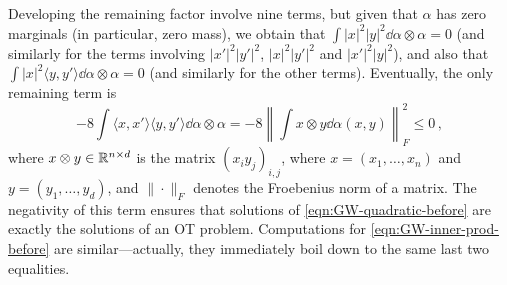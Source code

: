         Developing the remaining factor involve nine terms, but given that $\alpha$ has zero marginals (in particular, zero mass), we obtain that $\int |x|^2 |y|^2 \dd \alpha\! \otimes \!\alpha = 0$ (and similarly for the terms involving $|x'|^2 |y'|^2$, $|x|^2|y'|^2$ and $|x'|^2|y|^2$), and also that $\int |x|^2 \langle y,y' \rangle \dd \alpha\! \otimes\! \alpha = 0$ (and similarly for the other terms).
        Eventually, the only remaining term is
        \begin{equation}
            - 8 \int \langle x, x' \rangle \langle y,y' \rangle \dd \alpha \!\otimes\! \alpha \nonumber
            =  - 8 \left\| \int x \otimes y \dd \alpha(x,y) \right\|_F^2 \leq 0\,, \label{EqCorrelation1}
        \end{equation}
        where $x \otimes y \in \mathbb{R}^{n \times d}$ is the matrix $(x_i y_j)_{i,j}$, where $x = (x_1,\dots,x_n)$ and $y = (y_1,\dots, y_d)$, and $\| \cdot \|_F$ denotes the Froebenius norm of a matrix.
        The negativity of this term ensures that solutions of \cref{eqn:GW-quadratic-before} are exactly the solutions of an OT problem.
        Computations for \cref{eqn:GW-inner-prod-before} are similar---actually, they immediately boil down to the same last two equalities.
